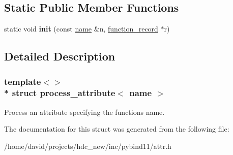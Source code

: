 \subsection*{Static Public Member Functions}
\begin{DoxyCompactItemize}
\item 
static void {\bfseries init} (const \hyperlink{structname}{name} \&n, \hyperlink{structfunction__record}{function\+\_\+record} $\ast$r)\hypertarget{structprocess__attribute_3_01name_01_4_a853a8daa0d8ef7d1980739f9785e67c1}{}\label{structprocess__attribute_3_01name_01_4_a853a8daa0d8ef7d1980739f9785e67c1}

\end{DoxyCompactItemize}


\subsection{Detailed Description}
\subsubsection*{template$<$$>$\\*
struct process\+\_\+attribute$<$ name $>$}

Process an attribute specifying the function\textquotesingle{}s name. 

The documentation for this struct was generated from the following file\+:\begin{DoxyCompactItemize}
\item 
/home/david/projects/hdc\+\_\+new/inc/pybind11/attr.\+h\end{DoxyCompactItemize}
